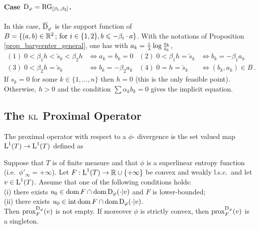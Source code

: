 \paragraph{Case $\operatorname{D}_\varphi = \operatorname{RG}_{[\beta_1, \beta_2]}$.}
In this case, $\overline{\operatorname{D}}_\varphi$ is the support function of $ B= \{ (a,b)\in \mathbb{R}^2\, ; \,\text{for } i\in \{1,2\}, b\leqslant -\beta_i \cdot a\} $. With the notations of Proposition \ref{prop_barycenter_general}, one has with $a_k=\frac{\varepsilon}{\lambda} \log \frac{s_k}{\tilde{s}_k}$, 
\begin{align*}
(1)\; 0 < \beta_1 h < \tilde{s}_k < \beta_2 h &\Leftrightarrow a_k = b_k = 0 &
(2)\; 0 < \beta_1 h = \tilde{s}_k &\Leftrightarrow b_k = -\beta_1 a_k \\
(3)\; 0 < \beta_2 h = \tilde{s}_k & \Leftrightarrow b_k = -\beta_2 a_k &
(4)\; 0 = h = \tilde{s}_k & \Leftrightarrow (b_k , a_k) \in B \, .
\end{align*}
If $s_k=0$ for some $k\in \{1, \dots, n\}$ then $h=0$ (this is the only feasible point). Otherwise, $h>0$ and the condition $\sum \alpha_k b_k = 0$ gives the implicit equation.


\iffalse
\subsection[The KL Proximal Operator]{The $\operatorname{KL}$ Proximal Operator}

\begin{defn}
The proximal operator with respect to a $\phi$- divergence is the set valued map $\text{\upshape L}^1(T) \to \text{\upshape L}^1 (T)$ defined as 
\end{defn}

\begin{proposition}
\label{prop_existenceprox}
Suppose that $T$ is of finite measure and that $\phi$ is a superlinear entropy function (i.e.\ $\phi'_\infty = + \infty$).
Let $F : \text{\upshape L}^1(T) \to \mathbb{R} \cup \{+ \infty\}$ be convex and weakly l.s.c.\ and let $v\in \text{\upshape L}^1(T)$. Assume that one of the following conditions holds:\\
\indent (i) there exists $u_0 \in \operatorname{dom} F \cap \operatorname{dom} \operatorname{D}_\varphi (\cdot | v) $ and $F$ is lower-bounded; \\
\indent (ii) there exists $u_0 \in \operatorname{int} \operatorname{dom} F \cap  \operatorname{dom} \operatorname{D}_\varphi(\cdot | v)$.\\
Then $\operatorname{prox}^{\operatorname{D}_\varphi}_F (v)$ is not empty.
If moreover $\phi$ is strictly convex, then $\operatorname{prox}^{\operatorname{D}_\varphi}_F (v)$ is a singleton.
\end{proposition}

